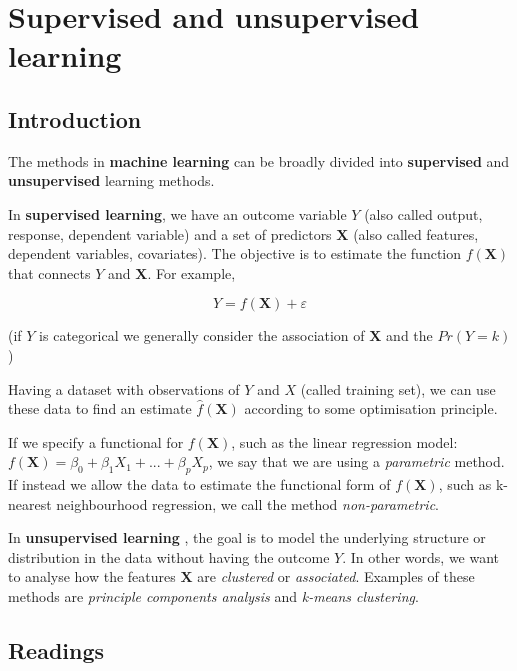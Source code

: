 \documentclass[
]{book}
\begin{document}
\hypertarget{supervised-and-unsupervised-learning}{%
\chapter{Supervised and unsupervised learning}\label{supervised-and-unsupervised-learning}}

\hypertarget{introduction}{%
\section{Introduction}\label{introduction}}

The methods in \textbf{machine learning} can be broadly divided into \textbf{supervised} and
\textbf{unsupervised} learning methods.

In \textbf{supervised learning}, we have an outcome variable \(Y\) (also called output,
response, dependent variable) and a set of predictors \(\mathbf{X}\) (also called
features, dependent variables, covariates). The objective is to estimate
the function \(f(\mathbf{X})\) that connects \(Y\) and \(\mathbf{X}\). For example,

\[
Y = f(\mathbf{X}) + \varepsilon
\]

(if \(Y\) is categorical we generally consider the association of \(\mathbf{X}\) and
the \(Pr(Y=k)\))

Having a dataset with observations of \(Y\) and \(X\) (called training set), we can
use these data to find an estimate \(\hat f(\mathbf{X})\) according to some
optimisation principle.

If we specify a functional for \(f(\mathbf{X})\), such as the linear regression
model:\(f(\mathbf{X}) = \beta_0 + \beta_1X_1 + ... + \beta_p X_p\), we say that
we are using a \emph{parametric} method. If instead we allow the data to estimate
the functional form of \(f(\mathbf{X})\), such as k-nearest neighbourhood
regression, we call the method \emph{non-parametric}.

In \textbf{unsupervised learning} , the goal is to model the
underlying structure or distribution in the data without having the outcome \(Y\).
In other words, we want to analyse how the features \(\mathbf{X}\) are \emph{clustered}
or \emph{associated}. Examples of these methods are \emph{principle components analysis}
and \emph{k-means clustering}.

\hypertarget{readings}{%
\section{Readings}\label{readings}}
\end{document}
